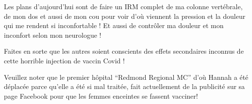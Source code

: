 Les plans d'aujourd'hui sont de faire un IRM complet de ma colonne vertébrale,
de mon dos et aussi de mon cou pour voir d'où viennent la pression et la douleur
qui me rendent si inconfortable ! Et aussi de contrôler ma douleur et mon
inconfort selon mon neurologue !

Faites en sorte que les autres soient conscients des effets secondaires inconnus
de cette horrible injection de vaccin Covid !

Veuillez noter que le premier hôpital “Redmond Regional MC” d'où Hannah a été
déplacée parce qu'elle a été si mal traitée, fait actuellement de la publicité
sur sa page Facebook pour que les femmes enceintes se fassent vacciner!

